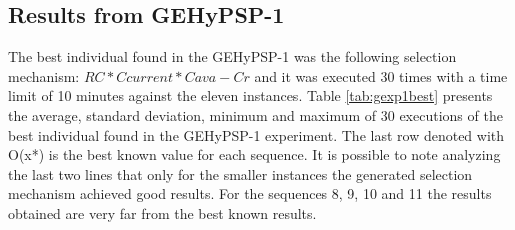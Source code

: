 \documentclass[conference]{IEEEtran}
\begin{document}




\subsection{Results from GEHyPSP-1}

The best individual found in the GEHyPSP-1 was the following selection mechanism:  $RC * Ccurrent * Cava - Cr$ and it was executed 30 times with a time limit of 10 minutes against the eleven instances. Table \ref{tab:gexp1best}  presents the average, standard deviation, minimum and maximum of 30 executions of the best individual found in the GEHyPSP-1 experiment. The last row denoted with O(x*) is the best known value for each sequence. It is possible to note analyzing the last two lines that only for the smaller instances the generated selection mechanism achieved good results. For the sequences 8, 9, 10 and 11 the results obtained are very far from the best known results.
\end{document}
